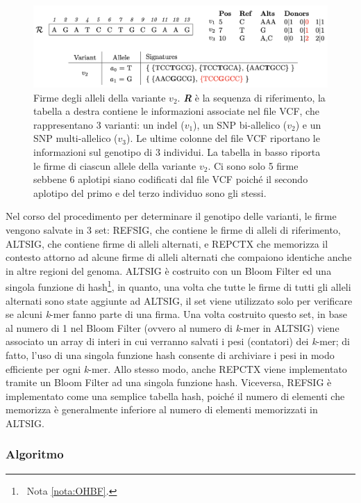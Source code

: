 \documentclass[../main.tex]{subfiles}
\begin{document}
 \begin{figure}[h!]
	\centering
  	\captionsetup{justification=justified}
 	\includegraphics[scale=.65]{images/malva-sign.png}
  	\caption{Firme degli alleli della variante $v_{2}$. \textit{\textbf{R}} è la sequenza di riferimento, la tabella a destra contiene le informazioni associate nel file VCF, che rappresentano 3 varianti: un indel ($v_{1}$), un SNP bi-allelico ($v_{2}$) e un SNP multi-allelico ($v_{3}$). Le ultime colonne del file VCF riportano le informazioni sul genotipo di 3 individui. La tabella in basso riporta le firme di ciascun allele della variante $v_{2}$. Ci sono solo 5 firme sebbene 6 aplotipi siano codificati dal file VCF poiché il secondo aplotipo del primo e del terzo individuo sono gli stessi.}
  	\label{fig:malvaSign}
\end{figure}


Nel corso del procedimento per determinare il genotipo delle varianti, le firme vengono salvate in 3 set: REFSIG, che contiene le firme di alleli di riferimento, ALTSIG, che contiene firme di alleli alternati, e REPCTX che memorizza il contesto attorno ad alcune firme di alleli alternati che compaiono identiche anche in altre regioni del genoma. ALTSIG è costruito con un Bloom Filter ed una singola funzione di hash\footnote{\ Nota \vref{nota:OHBF}.}, in quanto, una volta che tutte le firme di tutti gli alleli alternati sono state aggiunte ad ALTSIG, il set viene utilizzato solo per verificare se alcuni \textit{k}-mer fanno parte di una firma. Una volta costruito questo set, in base al numero di 1 nel Bloom Filter (ovvero al numero di \textit{k}-mer in ALTSIG) viene associato un array di interi in cui verranno salvati i pesi (contatori) dei \textit{k}-mer; di fatto, l'uso di una singola funzione hash consente di archiviare i pesi in modo efficiente per ogni \textit{k}-mer. Allo stesso modo, anche REPCTX viene implementato tramite un Bloom Filter ad una singola funzione hash. Viceversa, REFSIG è implementato come una semplice tabella hash, poiché il numero di elementi che memorizza è generalmente inferiore al numero di elementi memorizzati in ALTSIG. 


\subsubsection{Algoritmo}
\end{document}
